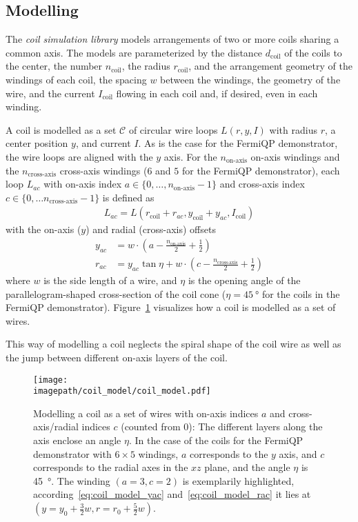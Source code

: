 \subsection*{Modelling}
The \textit{coil simulation library} models arrangements of two or more coils sharing a common axis. The models are parameterized by the distance $d_\text{coil}$ of the coils to the center, the number $n_\text{coil}$, the radius $r_\text{coil}$, and the arrangement geometry of the windings of each coil, the spacing $w$ between the windings, the geometry of the wire, and the current $I_\text{coil}$ flowing in each coil and, if desired, even in each winding.

A coil is modelled as a set $\mathcal{C}$ of circular wire loops $L(r, y, I)$ with radius $r$, a center position $y$, and current $I$. As is the case for the FermiQP demonstrator, the wire loops are aligned with the $y$ axis. For the $n_\text{on-axis}$ on-axis windings and the $n_\text{cross-axis}$ cross-axis windings ($6$ and $5$ for the FermiQP demonstrator), each loop $L_{ac}$ with on-axis index $a \in \{0, \ldots, n_\text{on-axis} - 1\}$ and cross-axis index $c \in \{0, \ldots n_\text{cross-axis} - 1\}$ is defined as
\begin{align}
    L_{ac} = L \left(r_\text{coil} + r_{ac}, y_\text{coil} + y_{ac}, I_\text{coil}\right)
\end{align}
with the on-axis ($y$) and radial (cross-axis) offsets
\begin{align}
    \label{eq:coil_model_yac}
    y_{ac} &= w\cdot \left(a-\frac{n_\text{on-axis}}{2} + \frac{1}{2}\right) \\
    \label{eq:coil_model_rac}
    r_{ac} &= y_{ac} \tan \eta + w \cdot \left(c - \frac{n_\text{cross-axis}}{2} + \frac{1}{2}\right)
\end{align}
where $w$ is the side length of a wire, and $\eta$ is the opening angle of the parallelogram-shaped cross-section of the coil cone ($\eta = \SI{45}{\degree}$ for the coils in the FermiQP demonstrator). Figure~\ref{fig:coil_model} visualizes how a coil is modelled as a set of wires.

This way of modelling a coil neglects the spiral shape of the coil wire as well as the jump between different on-axis layers of the coil.

\begin{figure}
    \centering
    \texttt{[image: \\imagepath/coil\_model/coil\_model.pdf]}
    \caption{Modelling a coil as a set of wires with on-axis indices $a$ and cross-axis/radial indices $c$ (counted from $0$): The different layers along the axis enclose an angle $\eta$. In the case of the coils for the FermiQP demonstrator with $6 \times 5$ windings, $a$ corresponds to the $y$ axis, and $c$ corresponds to the radial axes in the $xz$ plane, and the angle $\eta$ is \SI[]{45}{\degree}. The winding $(a = 3, c=2)$ is exemplarily highlighted, according~\eqref{eq:coil_model_yac} and~\eqref{eq:coil_model_rac} it lies at $(y = y_0 + \frac{3}{2}w, r = r_0 + \frac{5}{2}w)$.}
    \label{fig:coil_model}
\end{figure}

